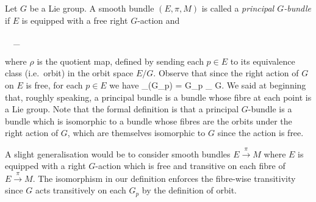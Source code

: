 \bd
Let $G$ be a Lie group. A smooth bundle $(E,\pi,M)$ is called a \emph{principal $G$-bundle} if $E$ is equipped with a free right $G$-action and
\bse
{}
\ \ \cong_{}
\ese
where $\rho$ is the quotient map, defined by sending each $p\in E$ to its equivalence class (i.e.\ orbit) in the orbit space $E/G$.
\ed
Observe that since the right action of $G$ on $E$ is free, for each $p\in E$ we have
\bse
\preim_\rho(G_p) = G_p \cong_{} G.
\ese
We said at beginning that, roughly speaking, a principal bundle is a bundle whose fibre at each point is a Lie group. Note that the formal definition is that a principal $G$-bundle is a bundle which is isomorphic to a bundle whose fibres are the orbits under the right action of $G$, which are themselves isomorphic to $G$ since the action is free.

\br
A slight generalisation would be to consider smooth bundles $E\xrightarrow{\,\pi\,}M$ where $E$ is equipped with a right $G$-action which is free and transitive on each fibre of $E\xrightarrow{\,\pi\,}M$. The isomorphism in our definition enforces the fibre-wise transitivity since $G$ acts transitively on each $G_p$ by the definition of orbit.
\er

